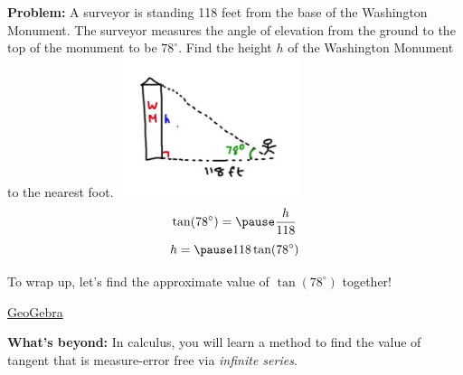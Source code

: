 \documentclass[10pt]{beamer}
\begin{document}
\begin{frame}

{\bf Problem:} A surveyor is standing 118 feet from the base of the Washington Monument. The surveyor measures the angle of elevation from the ground to the top of the monument to be $78^\circ$. Find the height $h$ of the Washington Monument to the nearest foot.
\includegraphics[width=0.4\textwidth, center]{washington-monument-surveyor.jpg}
\pause
\[
\tan(78^\circ) = \pause \frac{h}{118}
\]
\pause
\[
h=\pause118\tan(78^\circ)
\]
\end{frame}

\begin{frame}
To wrap up, let's find the approximate value of $\tan(78^\circ)$ together!

\href{https://www.geogebra.org/geometry}{GeoGebra}
\pause
\vspace{2em}

{\bf What's beyond:} In calculus, you will learn a method to find the value of tangent that is measure-error free via {\it infinite series}. 
\end{frame}
\end{document}
